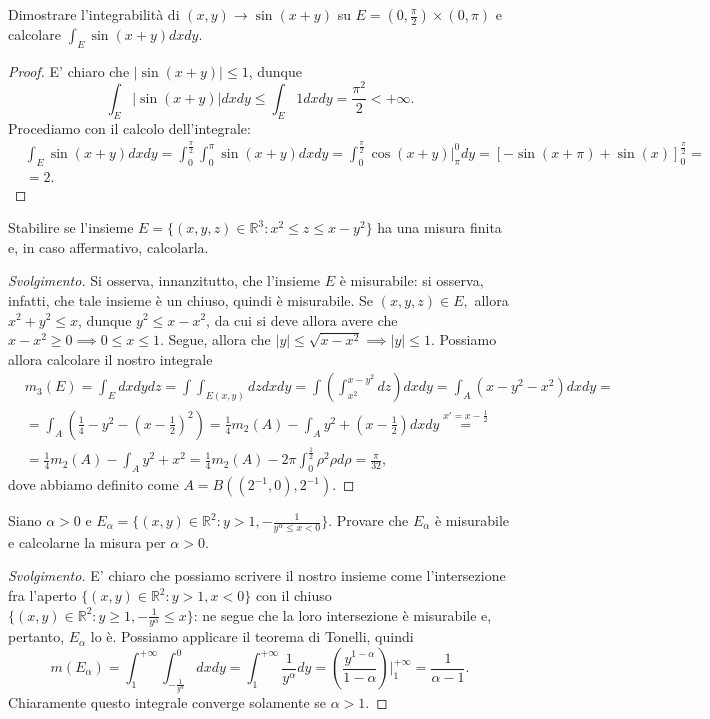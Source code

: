 \begin{exercise}
	Dimostrare l'integrabilità di $(x, y) \to \sin{(x+y)}$ su $E = (0, \frac{\pi}{2}) \times (0, \pi)$ e calcolare $\int_E \sin{(x+y)}dxdy$.
\end{exercise}
\begin{proof}
	E' chiaro che $|\sin{(x+y)}| \leq 1$, dunque
	$$
		\int_E |\sin{(x+y)}| dxdy \leq \int_E 1 dxdy = \frac{\pi^2}{2} < +\infty.
	$$
	Procediamo con il calcolo dell'integrale:
	\begin{align*}
		&\int_E \sin{(x+y)}dxdy = \int_0^{\frac{\pi}{2}} \int_0^\pi \sin{(x+y)}dxdy = \int_0^{\frac{\pi}{2}} \cos{(x+y)}|^0_\pi dy = \left[ -\sin{(x+\pi)} + \sin{(x)} \right]^\frac{\pi}{2}_0 = \\
		&= 2.
	\end{align*}
\end{proof}
\begin{exercise}
	Stabilire se l'insieme $E=\{(x, y, z) \in \mathbb{R}^3: x^2 \leq z \leq x - y^2 \}$ ha una misura finita e, in caso affermativo, calcolarla.
\end{exercise}
\begin{proof}[Svolgimento]
	Si osserva, innanzitutto, che l'insieme $E$ è misurabile: si osserva, infatti, che tale insieme è un chiuso, quindi è misurabile. Se $(x, y, z) \in E,$ allora $x^2 + y^2 \leq x$, dunque $y^2 \leq x - x^2$, da cui si deve allora avere che $x - x^2 \geq 0 \implies 0 \leq x \leq 1$. Segue, allora che $|y| \leq \sqrt{x - x^2} \implies |y| \leq 1$.
	Possiamo allora calcolare il nostro integrale
	\begin{align*}
	&m_3(E) = \int_E dxdydz = \int \int_{E(x, y)} dz dxdy = \int (\int_{x^2}^{x-y^2} dz)dxdy = \int_A (x - y^2 - x^2) dxdy = \\
	&=\int_A (\frac{1}{4} - y^2 - (x - \frac{1}{2})^2) =\frac{1}{4}m_2(A) - \int_A y^2 + (x-\frac{1}{2})dxdy \stackrel{x' = x-\frac{1}{2}}{=} \\
	&=\frac{1}{4} m_2(A) - \int_A y^2 + x^2 = \frac{1}{4} m_2(A) - 2 \pi \int_0^{\frac{1}{2}} \rho^2 \rho d\rho = \frac{\pi}{32},
	\end{align*}
	dove abbiamo definito come $A = B((2^{-1}, 0), 2^{-1})$.
\end{proof}
\begin{exercise}
	Siano $\alpha > 0$ e $E_\alpha = \{ (x, y) \in \mathbb{R}^2 : y>1, - \frac{1}{y^{\alpha} \leq x < 0 }\}$. Provare che $E_\alpha$ è misurabile e calcolarne la misura per $\alpha > 0$.
\end{exercise}
\begin{proof}[Svolgimento]
	E' chiaro che possiamo scrivere il nostro insieme come l'intersezione fra l'aperto $\{(x, y) \in \mathbb{R}^2: y > 1, x < 0 \}$ con il chiuso $\{ (x, y) \in \mathbb{R}^2 : y \geq 1, - \frac{1}{y^\alpha} \leq x \}$: ne segue che la loro intersezione è misurabile e, pertanto, $E_\alpha$ lo è. Possiamo applicare il teorema di Tonelli, quindi
	$$
		m(E_\alpha) = \int_1^{+\infty} \int_{-\frac{1}{y^{\alpha}}}^{0} dxdy = \int_1^{+\infty} \frac{1}{y^{\alpha}} dy = (\frac{y^{1-\alpha}}{1-\alpha})|^{+\infty}_1 = \frac{1}{\alpha - 1}. 
	$$
	Chiaramente questo integrale converge solamente se $\alpha > 1$.
\end{proof}
